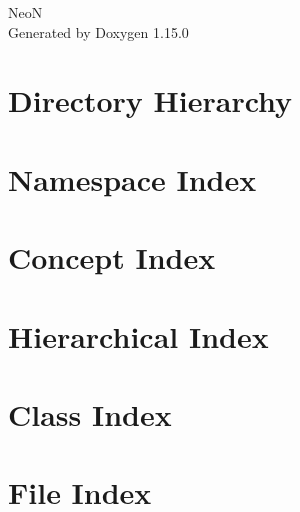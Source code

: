 \documentclass[twoside]{book}
\newcommand{\+}{\discretionary{\mbox{\scriptsize$\hookleftarrow$}}{}{}}
\newcommand{\clearemptydoublepage}{%
    \newpage{\pagestyle{empty}\cleardoublepage}%
  }
\begin{document}
  \raggedbottom
    \hypersetup{pageanchor=false,
                bookmarksnumbered=true,
                pdfencoding=unicode
               }
  \begin{titlepage}
  \vspace*{7cm}
  \begin{center}%
  {\Large NeoN}\\
  \vspace*{1cm}
  {\large Generated by Doxygen 1.15.0}\\
  \end{center}
  \end{titlepage}
  \clearemptydoublepage
  \tableofcontents
  \clearemptydoublepage
  \hypersetup{pageanchor=true}

\chapter{Directory Hierarchy}

\chapter{Namespace Index}

\chapter{Concept Index}

\chapter{Hierarchical Index}

\chapter{Class Index}

\chapter{File Index}

\end{document}

